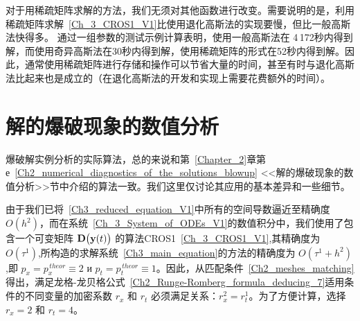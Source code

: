 \documentclass[twoside]{book}
\def\textbf{\bf}%
\begin{document}
\begin{CJK*}{GBK}{song}
对于用稀疏矩阵求解的方法，我们无须对其他函数进行改变。需要说明的是，利用稀疏矩阵求解~\eqref{Ch_3_CROS1_V1}比使用退化高斯法的实现要慢，但比一般高斯法快得多。
通过一组参数的测试示例计算表明，使用一般高斯法在 4\,172秒内得到解，而使用奇异高斯法在30秒内得到解，使用稀疏矩阵的形式在52秒内得到解。因此，通常使用稀疏矩阵进行存储和操作可以节省大量的时间，甚至有时与退化高斯法比起来也是成立的（在退化高斯法的开发和实现上需要花费额外的时间）。




\section{解的爆破现象的数值分析}

爆破解实例分析的实际算法，总的来说和第~\ref{Chapter_2}章第е~\ref{Ch2_numerical_diagnostics_of_the_solutions_blowup} <<解的爆破现象的数值分析>>节中介绍的算法一致。我们这里仅讨论其应用的基本差异和一些细节。

由于我们已将~\eqref{Ch3_reduced_equation_V1}中所有的空间导数逼近至精确度 $O(h^2)$，而在系统~\eqref{Ch_3_System_of_ODEs_V1}的数值积分中，我们使用了包含一个可变矩阵 $\emph{\textbf{D}}\big(\emph{\textbf{y}}(t)\big)$ 的算法CROS1~\eqref{Ch_3_CROS1_V1},其精确度为~$O(\tau^1)$,所构造的求解系统~\eqref{Ch3_main_equation}的方法的精确度为 $O(\tau^1 + h^2)$,即 $p_x = p_x^{\, theor} \equiv 2$ и $p_t = p_t^{\, theor} \equiv 1$。因此，从匹配条件~\eqref{Ch2_meshes_matching}得出，满足龙格-龙贝格公式~\eqref{Ch2_Runge-Romberg_formula_deducing_7}适用条件的不同变量的加密系数 $r_x$ 和 $r_t$ 必须满足关系：$r_x^2 = r_t^1$。为了方便计算，选择 $r_x = 2$ 和 $r_t = 4$。


\end{CJK*}
\end{document}

